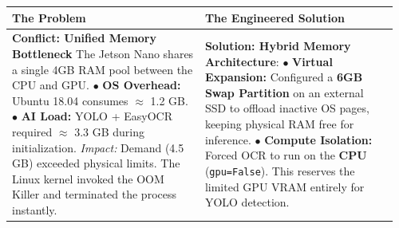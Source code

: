 {
	\renewcommand{\arraystretch}{1.5} 
	\small 
	
	\noindent
	\begin{tabular}{|p{0.48\linewidth}|p{0.48\linewidth}|}
		\hline
		\cellcolor{red!40!black}\textbf{\color{white} The Problem} & 
		\cellcolor{blue!40!black}\textbf{\color{white} The Engineered Solution} \\ 
		\hline
		\cellcolor{gray!10}
		\textbf{Conflict: Unified Memory Bottleneck} \newline
		The Jetson Nano shares a single 4GB RAM pool between the CPU and GPU.
		\newline \newline
		$\bullet$ \textbf{OS Overhead:} Ubuntu 18.04 consumes $\approx$ 1.2 GB. \newline
		$\bullet$ \textbf{AI Load:} YOLO + EasyOCR required $\approx$ 3.3 GB during initialization.
		\newline \newline
		\textit{Impact:} Demand (4.5 GB) exceeded physical limits. The Linux kernel invoked the OOM Killer and terminated the process instantly.
		& 
		\cellcolor{gray!10}
		\textbf{Solution: Hybrid Memory Architecture}:
		\newline \newline
		$\bullet$ \textbf{Virtual Expansion:} Configured a \textbf{6GB Swap Partition} on an external SSD to offload inactive OS pages, keeping physical RAM free for inference. \newline
		\newline			
		$\bullet$ \textbf{Compute Isolation:} Forced OCR to run on the \textbf{CPU} (\texttt{gpu=False}). This reserves the limited GPU VRAM entirely for YOLO detection. \\
		\hline
	\end{tabular}
}

